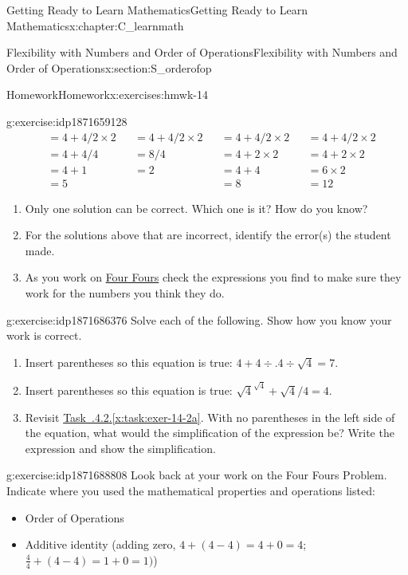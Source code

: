 \documentclass[oneside,10pt,]{book}
\newcommand{\xreffont}{\relax}
\numberwithin{equation}{chapter}
\newcommand{\amp}{&}
\begin{document}
\begin{chapterptx}{Getting Ready to Learn Mathematics}{}{Getting Ready to Learn Mathematics}{}{}{x:chapter:C_learnmath}
\begin{sectionptx}{Flexibility with Numbers and Order of Operations}{}{Flexibility with Numbers and Order of Operations}{}{}{x:section:S_orderofop}
\begin{exercises-subsection}{Homework}{}{Homework}{}{}{x:exercises:hmwk-14}
\begin{divisionexercise}{3}{}{}{g:exercise:idp1871659128}
\begin{align*}
\amp = 4 + 4 / 2 \times 2 \amp \amp = 4 + 4 / 2 \times 2 \amp \amp = 4 + 4 / 2 \times 2 \amp \amp = 4 + 4 / 2 \times 2\\
\amp = 4 + 4 / 4 \amp \amp = 8 / 4 \amp \amp = 4 + 2 \times 2 \amp \amp = 4 + 2 \times 2\\
\amp = 4 + 1 \amp \amp = 2 \amp \amp = 4 + 4 \amp \amp = 6 \times 2\\
\amp = 5 \amp \amp \amp \amp = 8 \amp \amp = 12
\end{align*}
%
\begin{enumerate}[font=\bfseries,label=(\alph*),ref=\alph*]
\item{}Only one solution can be correct. Which one is it? How do you know?%
\item{}For the solutions above that are incorrect, identify the error(s) the student made.%
\item{}As you work on \hyperref[x:worksheet:act-four-fours]{Four Fours} check the expressions you find to make sure they work for the numbers you think they do.%
\end{enumerate}
\end{divisionexercise}%
\begin{divisionexercise}{4}{}{}{g:exercise:idp1871686376}%
Solve each of the following. Show how you know your work is correct.%
\begin{enumerate}[font=\bfseries,label=(\alph*),ref=\alph*]
\item{}Insert parentheses so this equation is true: \(4 + 4 \div .4 \div \sqrt{4} = 7\).%
\item{}Insert parentheses so this equation is true: \(\sqrt{4}^{\sqrt{4}} + \sqrt{4} / 4 = 4\).%
\item{}Revisit \hyperref[x:task:exer-14-2a]{Task~{\xreffont 1.4.4.2}.{\xreffont\ref{x:task:exer-14-2a}}}. With no parentheses in the left side of the equation, what would the simplification of the expression be? Write the expression and show the simplification.%
\end{enumerate}
\end{divisionexercise}%
\begin{divisionexercise}{5}{}{}{g:exercise:idp1871688808}%
Look back at your work on the Four Fours Problem. Indicate where you used the mathematical properties and operations listed:%
\begin{itemize}[label=\textbullet]
\item{}Order of Operations%
\item{}Additive identity (adding zero, \(4 +(4 - 4) = 4 + 0 = 4\); \(\frac{4}{4}+(4-4)=1+0=1)\))%

\end{itemize}
\end{divisionexercise}
\end{exercises-subsection}
\end{sectionptx}
\end{chapterptx}
\end{document}
